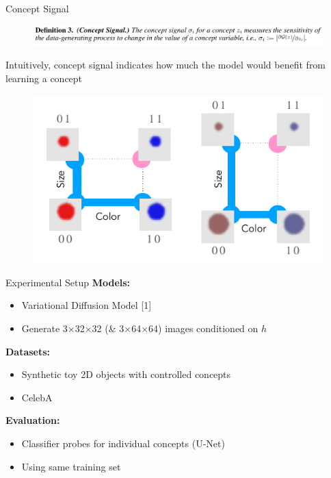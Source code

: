 \begin{frame}[t]{Concept Signal}
\begin{figure}
    \centering
    \includegraphics[width=0.77\linewidth]{figures/concept_signal_def.png}
    \end{figure}
    \quad Intuitively, concept signal indicates how much the model would benefit from learning a concept
    \begin{figure}
    \centering
    \includegraphics[width=0.49\linewidth]{figures/figure_2_concet_signal.png}
    \end{figure}
\end{frame}

\begin{frame}[t]{Experimental Setup}
\quad \textbf{Models:}
\begin{itemize}
    \item Variational Diffusion Model [1]
    \item Generate 3×32×32 (\& 3×64×64) images conditioned on $h$
\end{itemize}

\quad \textbf{Datasets:}
\begin{itemize}
    \item Synthetic toy 2D objects with controlled concepts
    \item CelebA
\end{itemize}

\quad \textbf{Evaluation:}
\begin{itemize}
    \item Classifier probes for individual concepts (U-Net)
    \item Using same training set
\end{itemize}
\end{frame}


